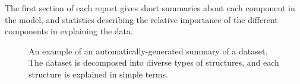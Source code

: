 \documentclass{article}
\begin{document}
The first section of each report gives short summaries about each component in the model, and statistics describing the relative importance of the different components in explaining the data.

\begin{figure}[h]
\centering
{}
\caption{
An example of an automatically-generated summary of a dataset.  The dataset is decomposed into diverse types of structures, and each structure is explained in simple terms.}
\label{fig:exec}
\end{figure}
\end{document}

